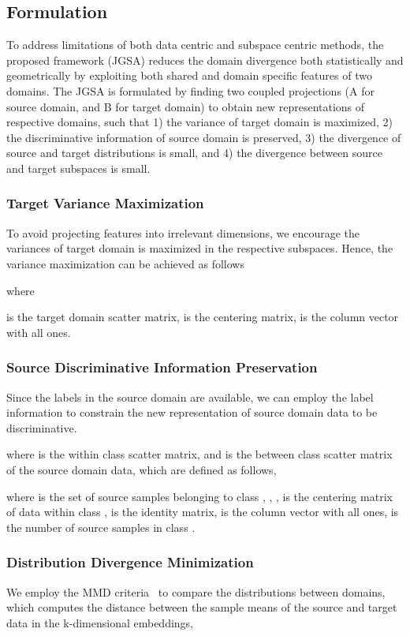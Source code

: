 \documentclass[10pt,twocolumn,letterpaper]{article}
\begin{document}
\subsection{Formulation}
To address limitations of both data centric and subspace centric methods, 
the proposed framework (JGSA) reduces the domain divergence both statistically and geometrically by exploiting both shared and domain specific features of two domains. 
The JGSA is formulated by finding two coupled projections (A for source domain, and B for target domain) to obtain new representations of respective domains, such that 1) the variance of target domain is maximized, 2) the discriminative information of source domain is preserved, 3) the divergence of source and target distributions is small, and 4) the divergence between source and target subspaces is small.

\vspace{-0.5em}
\subsubsection{Target Variance Maximization}
To avoid projecting features into irrelevant dimensions, we encourage the variances of target domain is maximized in the respective subspaces. Hence, the variance maximization can be achieved as follows

where 

is the target domain scatter matrix,  is the centering matrix,  is the column vector with all ones.

\vspace{-0.5em}
\subsubsection{Source Discriminative Information Preservation} 
Since the labels in the source domain are available, we can employ the label information to constrain the new representation of source domain data to be discriminative.


where  is the within class scatter matrix, and  is the between class scatter matrix of the source domain data, which are defined as follows,


where  is the set of source samples belonging to class , , ,  is the centering matrix of data within class ,  is the identity matrix,  is the column vector with all ones,  is the number of source samples in class .

\vspace{-0.5em}
\subsubsection{Distribution Divergence Minimization}
We employ the MMD criteria~\cite{Gretton2012,Pan2011,Long2013} to compare the distributions between domains, which computes the distance between the sample means of the source and target data in the k-dimensional embeddings,
\end{document}

